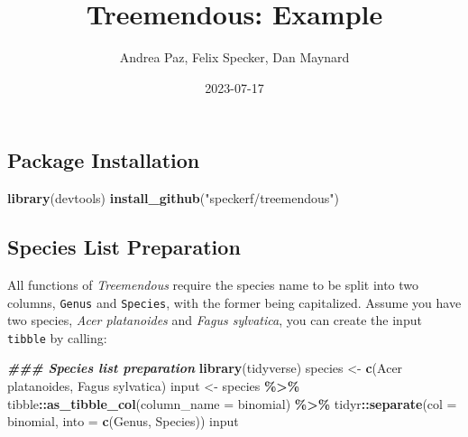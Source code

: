 \documentclass[
  11pt,
]{article}
\title{Treemendous: Example}
\author{Andrea Paz, Felix Specker, Dan Maynard}
\date{2023-07-17}
\newenvironment{Shaded}{\begin{snugshade}}{\end{snugshade}}
\newcommand{\AttributeTok}[1]{\textcolor[rgb]{0.13,0.29,0.53}{#1}}
\newcommand{\DocumentationTok}[1]{\textcolor[rgb]{0.56,0.35,0.01}{\textbf{\textit{#1}}}}
\newcommand{\FunctionTok}[1]{\textcolor[rgb]{0.13,0.29,0.53}{\textbf{#1}}}
\newcommand{\NormalTok}[1]{#1}
\newcommand{\OtherTok}[1]{\textcolor[rgb]{0.56,0.35,0.01}{#1}}
\newcommand{\SpecialCharTok}[1]{\textcolor[rgb]{0.81,0.36,0.00}{\textbf{#1}}}
\newcommand{\StringTok}[1]{\textcolor[rgb]{0.31,0.60,0.02}{#1}}
\begin{document}
\maketitle

\hypertarget{package-installation}{%
\subsection{Package Installation}\label{package-installation}}

\begin{Shaded}
\begin{Highlighting}[]
\FunctionTok{library}\NormalTok{(devtools)}
\FunctionTok{install\_github}\NormalTok{(}\StringTok{"speckerf/treemendous"}\NormalTok{)}
\end{Highlighting}
\end{Shaded}

\hypertarget{species-list-preparation}{%
\subsection{Species List Preparation}\label{species-list-preparation}}

All functions of \textit{Treemendous} require the species name to be
split into two columns, \verb|Genus| and \verb|Species|, with the former
being capitalized. Assume you have two species,
\textit{Acer platanoides} and \textit{Fagus sylvatica}, you can create
the input \verb|tibble| by calling:

\begin{Shaded}
\begin{Highlighting}[]
\DocumentationTok{\#\#\# Species list preparation}
\FunctionTok{library}\NormalTok{(tidyverse)}
\NormalTok{species }\OtherTok{\textless{}{-}} \FunctionTok{c}\NormalTok{(}\StringTok{\textquotesingle{}Acer platanoides\textquotesingle{}}\NormalTok{, }\StringTok{\textquotesingle{}Fagus sylvatica\textquotesingle{}}\NormalTok{)}
\NormalTok{input }\OtherTok{\textless{}{-}}\NormalTok{ species }\SpecialCharTok{\%\textgreater{}\%}
\NormalTok{  tibble}\SpecialCharTok{::}\FunctionTok{as\_tibble\_col}\NormalTok{(}\AttributeTok{column\_name =} \StringTok{\textquotesingle{}binomial\textquotesingle{}}\NormalTok{) }\SpecialCharTok{\%\textgreater{}\%}
\NormalTok{  tidyr}\SpecialCharTok{::}\FunctionTok{separate}\NormalTok{(}\AttributeTok{col =} \StringTok{\textquotesingle{}binomial\textquotesingle{}}\NormalTok{, }\AttributeTok{into =} \FunctionTok{c}\NormalTok{(}\StringTok{\textquotesingle{}Genus\textquotesingle{}}\NormalTok{, }\StringTok{\textquotesingle{}Species\textquotesingle{}}\NormalTok{))}
\NormalTok{input}
\end{Highlighting}
\end{Shaded}
\end{document}
